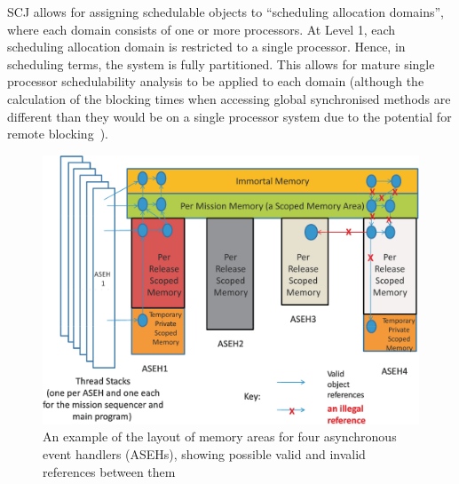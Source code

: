 
SCJ allows for assigning schedulable objects to ``scheduling
allocation domains'', where each domain consists of one or more
processors.
At Level 1, each scheduling allocation domain is restricted to a
single processor.
Hence, in scheduling terms, the system is fully partitioned.
This allows for mature single processor schedulability analysis to be
applied to each domain (although the calculation of the blocking times
when accessing global synchronised methods are different than they
would be on a single processor system due to the potential for remote
blocking~\cite{davis2011}).

\begin{figure}[t]
  \includegraphics[width=\textwidth]{Stacks-Areas.pdf}
  \caption{An example of the layout of memory areas for four
    asynchronous event handlers (ASEHs), showing possible valid and
    invalid references between them}
  \label{stacks-areas-diagram}
\end{figure}

